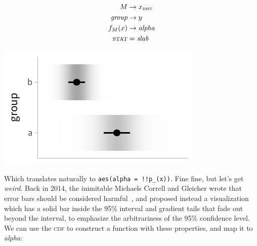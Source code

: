 \documentclass[journal]{vgtc}                     %
\begin{document}
\noindent
\begin{minipage}{.5\columnwidth}

\begin{align*}
M &\rightarrow x_\textsc{dist}\\
\textit{group} &\rightarrow y\\
f_M(x) &\rightarrow \textit{alpha}\\
\textsc{stat} &= \mathit{slab}
\end{align*}
\end{minipage}%
  \begin{minipage}{.4\columnwidth}
    \centering
    \includegraphics[width=1.2\columnwidth]{figs/3-slab_gradient_two_groups.pdf}
  \end{minipage}
\hfill\break

Which translates naturally to \texttt{aes(alpha = !!p\_(x))}. Fine fine, but let's get \textit{weird}. Back in 2014, the inimitable Michaels Correll and Gleicher wrote that error bars should be considered harmful~\cite{correll2014error}, and proposed instead a visualization which has a solid bar inside the 95\% interval and gradient tails that fade out beyond the interval, to emphasize the arbitrariness of the 95\% confidence level. We can use the \textsc{cdf} to construct a function with these properties, and map it to \textit{alpha}:
\end{document}
